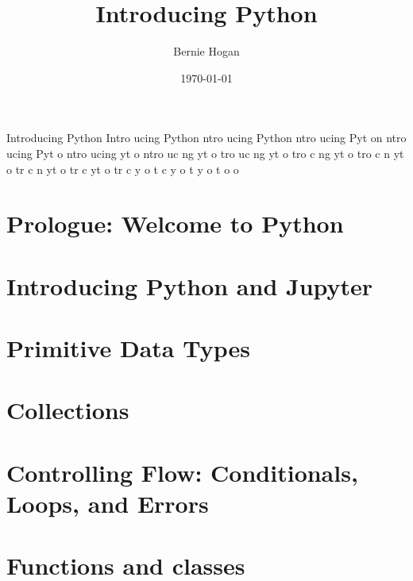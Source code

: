 \documentclass{book}
\newenvironment{centerverbatim}{%
  \par
  \centering
  \varwidth{\linewidth}%
  \verbatim
}{%
  \endverbatim
  \endvarwidth
  \par
}
\begin{document}
\title{Introducing Python}
\author{Bernie Hogan}
\date{\today}

\maketitle

\pagestyle{empty}
\begin{centerverbatim}
Introducing Python
Intro ucing Python
 ntro ucing Python
 ntro ucing Pyt on
 ntro ucing Pyt o
 ntro ucing  yt o
 ntro uc ng  yt o
  tro uc ng  yt o
  tro  c ng  yt o
  tro  c n   yt o
  tr   c n   yt o
  tr   c     yt o
  tr   c     y  o
  t    c     y  o
  t          y  o
  t             o
                o
\end{centerverbatim}


\tableofcontents

\frontmatter

\chapter{Prologue: Welcome to Python}
\label{ch:prologue}


\mainmatter
\chapter{Introducing Python and Jupyter}
\label{ch:intro}


\chapter{Primitive Data Types}
\label{ch:datatypes}


\chapter{Collections}
\label{ch:collections}


\chapter{Controlling Flow: Conditionals, Loops, and Errors}
\label{ch:flow}


\chapter{Functions and classes}
\label{ch:functions}

\end{document}
